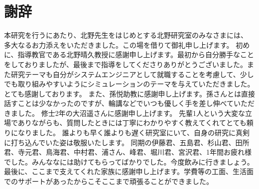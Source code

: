 \chapter*{謝辞}
本研究を行うにあたり、北野先生をはじめとする北野研究室のみなさまには、
多大なるお力添えをいただきました。この場を借りて御礼申し上げます。
初めに、指導教官である北野晴久教授に感謝申し上げます。最初から自分勝手なことをしておりましたが、最後まで指導をしてくださりありがとうございました。また研究テーマも自分がシステムエンジニアとして就職することを考慮して、少しでも取り組みやすいようにシミュレーションのテーマを与えていただきました。とても感謝しております。
また、孫悦助教に感謝申し上げます。孫さんとは直接話すことは少なかったのですが、輪講などでいつも優しく手を差し伸べていただきました。
修士2年の大沼遥さんに感謝申し上げます。
先輩1人という大変な立場でありながらも、質問したときには丁寧にわかりやすく教えてくれてとても頼りになりました。
誰よりも早く誰よりも遅く研究室にいて、自身の研究に真剣に打ち込んでいた姿は敬服いたします。
同期の伊藤君、五島君、杉山君、田所君、寺元君、鳥海君、中村君、浦さん、峰君、堀川君、宮沢君、1年間お疲れ様でした。みんななには助けてもらってばかりでした。今度飲みに行きましょう。
最後に、ここまで支えてくれた家族に感謝申し上げます。学費等の工面、生活面でのサポートがあったからこそここまで頑張ることができました。
